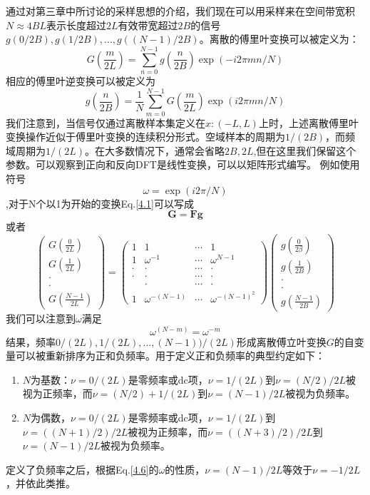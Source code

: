 \documentclass[12pt, UTF8]{ctexart}%
\numberwithin{equation}{section}
\numberwithin{figure}{section}
\newcommand{\InsertEqution}[2]{\begin{equation}
  \label{#1}
   #2
 \end{equation}}
\newcommand{\RefEq}[1]{Eq.\ref{#1}}
\newcommand{\InsertInlineEq}[1]{$#1$}
\newcommand{\InsertItem}[1]{\begin{enumerate} #1 \end{enumerate}}
\begin{document}
\begin{sloppypar}
通过对第三章中所讨论的采样思想的介绍，我们现在可以用采样来在空间带宽积\InsertInlineEq{N\approx4BL}表示长度超过\InsertInlineEq{2L}有效带宽超过\InsertInlineEq{2B}的信号\InsertInlineEq{g(0/2B),g(1/2B),...,g((N-1)/2B)}。离散的傅里叶变换可以被定义为：\InsertEqution{4.1}{G\left(\frac{m}{2 L}\right)=\sum_{n=0}^{N-1} g\left(\frac{n}{2 B}\right) \exp (-i 2 \pi m n / N)}
相应的傅里叶逆变换可以被定义为\InsertEqution{4.2}{g\left(\frac{n}{2 B}\right)=\frac{1}{N} \sum_{m=0}^{N-1} G\left(\frac{m}{2 L}\right) \exp (i 2 \pi m n / N)}
我们注意到，当信号仅通过离散样本集定义在\InsertInlineEq{x:(-L,L)}上时，上述离散傅里叶变换操作近似于傅里叶变换的连续积分形式。空域样本的周期为\InsertInlineEq{1/(2B)}，而频域周期为\InsertInlineEq{1/(2L)}。在大多数情况下，通常会省略\InsertInlineEq{2B,2L},但在这里我们保留这个参数。可以观察到正向和反向DFT是线性变换，可以以矩阵形式编写。 例如使用符号\InsertEqution{4.3}{\omega=\exp (i 2 \pi / N)},对于N个以1为开始的变换\RefEq{4.1}可以写成\InsertEqution{4.4}{\mathbf{G}=\mathbf{F} \mathbf{g}}或者\InsertEqution{4.5}{\left(\begin{array}{c}
  G\left(\frac{0}{2 L}\right) \\
  G\left(\frac{1}{2 L}\right) \\
  \cdot \\
  \cdot \\
  G\left(\frac{N-1}{2 L}\right)
  \end{array}\right)=\left(\begin{array}{cccc}
  1 & 1 & \cdots & 1 \\
  1 & \omega^{-1} & \cdots & \omega^{N-1} \\
  \cdot & \cdot & \cdots & \cdot \\
  \cdot & \cdot & \cdots & \cdot \\
  & \cdot & \cdots & \cdot \\
  1 & \omega^{-(N-1)} & \cdots & \omega^{-(N-1)^{2}}
  \end{array}\right)\left(\begin{array}{c}
  g\left(\frac{0}{2 \beta}\right) \\
  g\left(\frac{1}{2 B}\right) \\
  \cdot \\
  \cdot \\
  g\left(\frac{N-1}{2 B}\right)
  \end{array}\right)}
我们可以注意到\InsertInlineEq{\omega}满足\InsertEqution{4.6}{\omega^{(N-m)}=\omega^{-m}}
结果，频率\InsertInlineEq{0/(2L),1/(2L),...,(N-1))/(2L)}形成离散傅立叶变换\InsertInlineEq{G}的自变量可以被重新排序为正和负频率。用于定义正和负频率的典型约定如下：
\InsertItem{\item \InsertInlineEq{N}为基数：\InsertInlineEq{\nu = 0/(2L)}是零频率或dc项，\InsertInlineEq{\nu=1/(2L)}到\InsertInlineEq{\nu=(N/2)/2L}被视为正频率，而\InsertInlineEq{\nu=(N/2)+1/(2L)}到\InsertInlineEq{\nu=(N-1)/2L}被视为负频率。
\item \InsertInlineEq{N}为偶数，\InsertInlineEq{\nu = 0/(2L)}是零频率或dc项，\InsertInlineEq{\nu=1/(2L)}到\InsertInlineEq{\nu=((N+1)/2)/2L}被视为正频率，而\InsertInlineEq{\nu=((N+3)/2)/2L}到\InsertInlineEq{\nu=(N-1)/2L}被视为负频率。}
定义了负频率之后，根据\RefEq{4.6}的\InsertInlineEq{\omega}的性质，\InsertInlineEq{\nu=(N-1)/2L}等效于\InsertInlineEq{\nu=-1/2L}，并依此类推。

\end{sloppypar}
\end{document}
